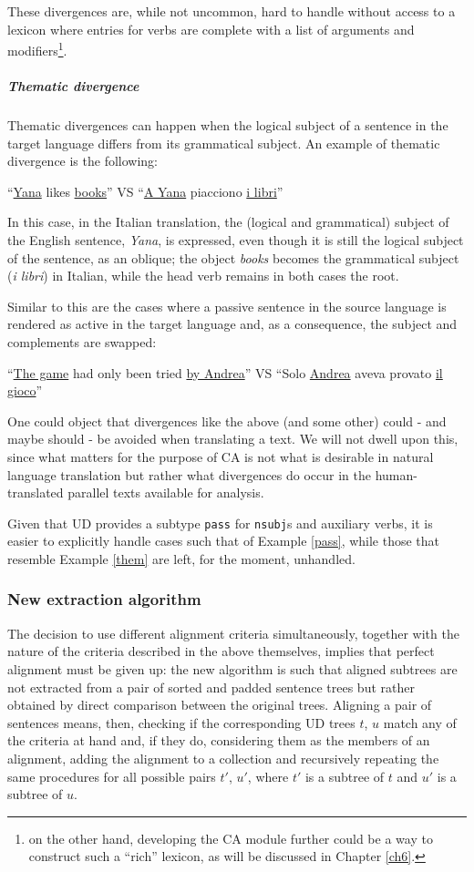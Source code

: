 These divergences are, while not uncommon, hard to handle without access to a lexicon where entries for verbs are complete with a list of arguments and modifiers\footnote{on the other hand, developing the CA module further could be a way to construct such a ``rich'' lexicon, as will be discussed in Chapter \ref{ch6}.}.

\subparagraph*{Thematic divergence}
Thematic divergences can happen when the logical subject of a sentence in the target language differs from its grammatical subject. An example of thematic divergence is the following:
\begin{example} \label{them}
 ``\underline{Yana} likes \underline{books}'' VS ``\underline{A Yana} piacciono \underline{i libri}''
\end{example}
In this case, in the Italian translation, the (logical and grammatical) subject of the English sentence, \textit{Yana}, is expressed, even though it is still the logical subject of the sentence, as an oblique; the object \textit{books} becomes the grammatical subject (\textit{i libri}) in Italian, while the head verb remains in both cases the root. \smallskip

Similar to this are the cases where a passive sentence in the source language is rendered as active in the target language and, as a consequence, the subject and complements are swapped:
\begin{example} \label{pass}
 ``\underline{The game} had only been tried \underline{by Andrea}'' VS ``Solo \underline{Andrea} aveva provato \underline{il gioco}''
\end{example} \smallskip

One could object that divergences like the above (and some other) could - and maybe should - be avoided when translating a text. We will not dwell upon this, since what matters for the purpose of CA is not what is desirable in natural language translation but rather what divergences do occur in the human-translated parallel texts available for analysis. \smallskip

Given that UD provides a subtype \texttt{pass} for \texttt{nsubj}s and auxiliary verbs, it is easier to explicitly handle cases such that of Example \ref{pass}, while those that resemble Example \ref{them} are left, for the moment, unhandled.

\subsubsection{New extraction algorithm} \label{extralg}
The decision to use different alignment criteria simultaneously, together with the nature of the criteria described in the above themselves, implies that perfect alignment must be given up: the new algorithm is such that aligned subtrees are not extracted from a pair of sorted and padded sentence trees but rather obtained by direct comparison between the original trees. Aligning a pair of sentences means, then, checking if the corresponding UD trees $t$, $u$ match any of the criteria at hand and, if they do, considering them as the members of an alignment, adding the alignment to a collection and recursively repeating the same procedures for all possible pairs $t'$, $u'$, where $t'$ is a subtree of $t$ and $u'$ is a subtree of $u$.

